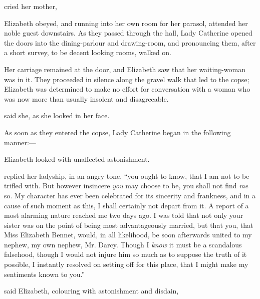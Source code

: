  cried her mother, 

Elizabeth obeyed, and running into her own room for her parasol, attended her noble guest downstairs. As they passed through the hall, Lady Catherine opened the doors into the dining-parlour and drawing-room, and pronouncing them, after a short survey, to be decent looking rooms, walked on.

Her carriage remained at the door, and Elizabeth saw that her waiting-woman was in it. They proceeded in silence along the gravel walk that led to the copse; Elizabeth was determined to make no effort for conversation with a woman who was now more than usually insolent and disagreeable.

 said she, as she looked in her face.

As soon as they entered the copse, Lady Catherine began in the following manner:---


Elizabeth looked with unaffected astonishment.


 replied her ladyship, in an angry tone, “you ought to know, that I am not to be trifled with. But however insincere {\em you} may choose to be, you shall not find {\em me} so. My character has ever been celebrated for its sincerity and frankness, and in a cause of such moment as this, I shall certainly not depart from it. A report of a most alarming nature reached me two days ago. I was told that not only your sister was on the point of being most advantageously married, but that you, that Miss Elizabeth Bennet, would, in all likelihood, be soon afterwards united to my nephew, my own nephew, Mr. Darcy. Though I {\em know} it must be a scandalous falsehood, though I would not injure him so much as to suppose the truth of it possible, I instantly resolved on setting off for this place, that I might make my sentiments known to you.”

 said Elizabeth, colouring with astonishment and disdain, 

